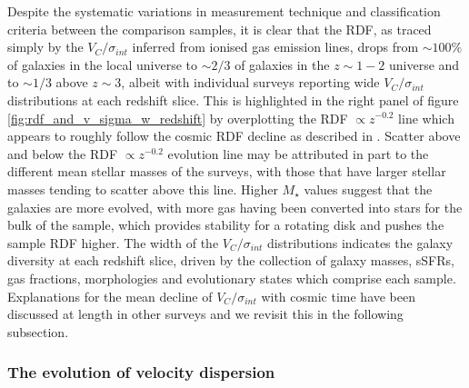 \documentclass[fleqn,usenatbib]{mn2e}
\begin{document}
Despite the systematic variations in measurement technique and classification criteria between the comparison samples, it is clear that the RDF, as traced simply by the $V_{C}/\sigma_{int}$ inferred from ionised gas emission lines, drops from $\sim 100\%$ of galaxies in the local universe to $\sim 2/3$ of galaxies in the $z \sim 1-2$ universe and to $\sim 1/3$ above $z \sim 3$, albeit with individual surveys reporting wide $V_{C}/\sigma_{int}$ distributions at each redshift slice.
This is highlighted in the right panel of figure \ref{fig:rdf_and_v_sigma_w_redshift} by overplotting the RDF $\propto z^{-0.2}$ line which appears to roughly follow the cosmic RDF decline as described in \cite{Stott2016}. 
Scatter above and below the RDF $\propto z^{-0.2}$ evolution line may be attributed in part to the different mean stellar masses of the surveys, with those that have larger stellar masses tending to scatter above this line.
Higher $M_{\star}$ values suggest that the galaxies are more evolved, with more gas having been converted into stars for the bulk of the sample, which provides stability for a rotating disk and pushes the sample RDF higher.
The width of the $V_{C}/\sigma_{int}$ distributions indicates the galaxy diversity at each redshift slice, driven by the collection of galaxy masses, sSFRs, gas fractions, morphologies and evolutionary states which comprise each sample.
Explanations for the mean decline of $V_{C}/\sigma_{int}$ with cosmic time have been discussed at length in other surveys \citep[e.g][]{ForsterSchreiber2009,Law2009,Wisnioski2015} and we revisit this in the following subsection.

\subsubsection{The evolution of velocity dispersion}\label{subsubsec:sigma_evolution}
\end{document}
